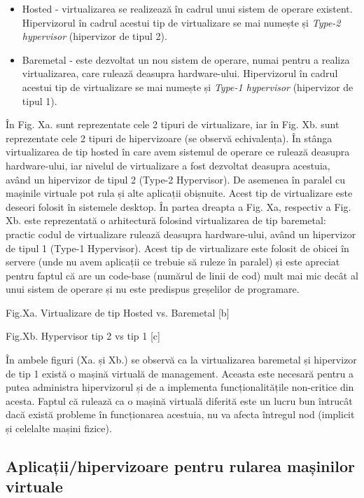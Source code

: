 \begin{itemize}
	\item Hosted - virtualizarea se realizează în cadrul unui sistem de
		operare existent. Hipervizorul în cadrul acestui tip de
		virtualizare se mai numește și \textit{Type-2 hypervisor}
		(hipervizor de tipul 2).
	\item Baremetal - este dezvoltat un nou sistem de operare, numai pentru
		a realiza virtualizarea, care rulează deasupra hardware-ului.
		Hipervizorul în cadrul acestui tip de virtualizare se mai
		numește și \textit{Type-1 hypervisor} (hipervizor de tipul 1).
\end{itemize}

În Fig. Xa. sunt reprezentate cele 2 tipuri de virtualizare, iar în Fig. Xb.
sunt reprezentate cele 2 tipuri de hipervizoare (se observă echivalența). În
stânga virtualizarea de tip hosted în care avem sistemul de operare ce rulează
deasupra hardware-ului, iar nivelul de virtualizare a fost dezvoltat deasupra
acestuia, având un hipervizor de tipul 2 (Type-2 Hypervisor). De asemenea în
paralel cu mașinile virtuale pot rula și alte aplicații obișnuite. Acest tip de
virtualizare este deseori folosit în sistemele desktop. În partea dreapta a Fig.
Xa, respectiv a Fig. Xb. este reprezentată o arhitectură folosind virtualizarea
de tip baremetal: practic codul de virtualizare rulează deasupra hardware-ului,
având un hipervizor de tipul 1 (Type-1 Hypervisor). Acest tip de virtualizare
este folosit de obicei în servere (unde nu avem aplicații ce trebuie să ruleze
în paralel) și este apreciat pentru faptul că are un code-base (numărul de linii
de cod) mult mai mic decât al unui sistem de operare și nu este predispus
greșelilor de programare.

Fig.Xa. Virtualizare de tip Hosted vs. Baremetal [b]

Fig.Xb. Hypervisor tip 2 vs tip 1 [c]

În ambele figuri (Xa. și Xb.) se observă ca la virtualizarea baremetal și
hipervizor de tip 1 există o mașină virtuală de management. Aceasta este
necesară pentru a putea administra hipervizorul și de a implementa
funcționalitățile non-critice din acesta. Faptul că rulează ca o mașină virtuală
diferită este un lucru bun întrucât dacă există probleme în funcționarea
acestuia, nu va afecta întregul nod (implicit și celelalte mașini fizice).

\subsection{Aplicații/hipervizoare pentru rularea mașinilor virtuale}
\label{sec:vm-intro-apps}

